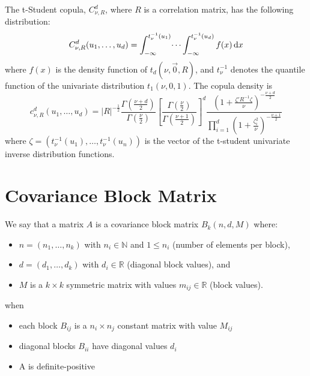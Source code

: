 \documentclass[11pt,fleqn]{book} %
\begin{document}
\begin{proposition}
	The t-Student copula, $C_{\nu,R}^d$, where $R$ is a correlation matrix,
	has the following distribution:
	\begin{displaymath}
		C_{\nu,R}^d(u_1, \dots, u_d) = 
		\int_{-\infty}^{t_\nu^{-1}(u_1)} \dots \int_{-\infty}^{t_\nu^{-1}(u_d)} f(x) \mathop{\mathrm{{}d}}\mathopen{} x
	\end{displaymath}
	where $f(x)$ is the density function of $t_d(\nu,\vec{0},R)$, and $t_{\nu}^{-1}$ 
	denotes the quantile function of the univariate distribution $t_1(\nu,0,1)$. 
	The copula density is
	\begin{displaymath}
		\label{eq:density}
		c_{\nu,R}^d(u_1,\dots,u_d) =
		|R|^{-\frac{1}{2}} 
		\displaystyle\frac{\Gamma{\left(\frac{\nu+d}{2}\right)}}{\Gamma{\left(\frac{\nu}{2}\right)}}
		\displaystyle\left[ \frac{\Gamma{\left(\frac{\nu}{2}\right)}}{\Gamma{\left(\frac{\nu+1}{2}\right)}} \right]^d
		\frac{\displaystyle\left( 1+\frac{\zeta' R^{-1} \zeta}{\nu}\right)^{-\frac{\nu+d}{2}}}{\displaystyle\prod_{i=1}^d \left( 1+\frac{\zeta_i^2}{\nu} \right)^{-\frac{\nu+1}{2}}}
	\end{displaymath}
	\noindent
	where $\zeta=(t_\nu^{-1}(u_1), \dots, t_\nu^{-1}(u_n))$ is the vector of 
	the t-student univariate inverse distribution functions.
\end{proposition}

\section{Covariance Block Matrix}

\begin{definition}
	We say that a matrix $A$ is a covariance block matrix $B_k(n,d,M)$ where:
	\begin{itemize}
		\item $n=(n_1,\dots,n_k)$ with $n_i \in \mathbb{N}$ and $1 \le n_i$ (number of elements per block),
		\item $d=(d_1,\dots,d_k)$ with $d_i \in \mathbb{R}$ (diagonal block values), and
		\item $M$ is a $k \times k$ symmetric matrix with values $m_{ij} \in \mathbb{R}$ (block values).
	\end{itemize}
	when
	\begin{itemize}
		\item each block $B_{ij}$ is a $n_i \times n_j$ constant matrix with value $M_{ij}$
		\item diagonal blocks $B_{ii}$ have diagonal values $d_i$
		\item A is definite-positive
	\end{itemize}
\end{definition}
\end{document}
